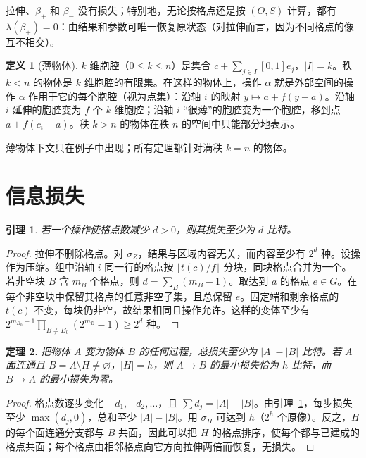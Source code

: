 \documentclass[11pt,a4paper]{article}
\theoremstyle{plain}
\newtheorem{theorem}{定理}
\newtheorem{lemma}[theorem]{引理}
\theoremstyle{definition}
\newtheorem{definition}{定义}
\theoremstyle{remark}
\begin{document}
拉伸、$\beta_+$ 和 $\beta_-$ 没有损失；特别地，无论按格点还是按 $(O,S)$ 计算，都有 $\lambda(\beta_\pm)=0$：由结果和参数可唯一恢复原状态（对拉伸而言，因为不同格点的像互不相交）。

\begin{definition}[薄物体]
$k$ 维胞腔（$0\le k\le n$）是集合 $c+\sum_{j\in I}[0,1]e_j$，$|I|=k$。秩 $k<n$ 的物体是 $k$ 维胞腔的有限集。在这样的物体上，操作 $\alpha$ 就是外部空间的操作 $\alpha$ 作用于它的每个胞腔（视为点集）：沿轴 $i$ 的映射 $y\mapsto a+f(y-a)$。沿轴 $i$ 延伸的胞腔变为 $f$ 个 $k$ 维胞腔；沿轴 $i$ “很薄”的胞腔变为一个胞腔，移到点 $a+f(c_i-a)$。秩 $k>n$ 的物体在秩 $n$ 的空间中只能部分地表示。
\end{definition}

薄物体下文只在例子中出现；所有定理都针对满秩 $k=n$ 的物体。

\section{信息损失}\label{sec:loss}

\begin{lemma}\label{lem:bit}
若一个操作使格点数减少 $d>0$，则其损失至少为 $d$ 比特。
\end{lemma}
\begin{proof}
拉伸不删除格点。对 $\sigma_Z$，结果与区域内容无关，而内容至少有 $2^d$ 种。设操作为压缩。组中沿轴 $i$ 同一行的格点按 $\lfloor t(c)/f\rfloor$ 分块，同块格点合并为一个。若非空块 $B$ 含 $m_B$ 个格点，则 $d=\sum_B(m_B-1)$。取达到 $a$ 的格点 $e\in G$。在每个非空块中保留其格点的任意非空子集，且总保留 $e$。固定端和剩余格点的 $t(c)$ 不变，每块仍非空，故结果相同且操作允许。这样的变体至少有 $2^{m_{B_0}-1}\prod_{B\ne B_0}(2^{m_B}-1)\ge 2^{d}$ 种。
\end{proof}

\begin{theorem}\label{thm:loss}
把物体 $A$ 变为物体 $B$ 的任何过程，总损失至少为 $|A|-|B|$ 比特。若 $A$ 面连通且 $B=A\setminus H\neq\varnothing$，$|H|=h$，则 $A\to B$ 的最小损失恰为 $h$ 比特，而 $B\to A$ 的最小损失为零。
\end{theorem}
\begin{proof}
格点数逐步变化 $-d_1,-d_2,\dots$，且 $\sum d_j=|A|-|B|$。由引理~\ref{lem:bit}，每步损失至少 $\max(d_j,0)$，总和至少 $|A|-|B|$。用 $\sigma_H$ 可达到 $h$（$2^h$ 个原像）。反之，$H$ 的每个面连通分支都与 $B$ 共面，因此可以把 $H$ 的格点排序，使每个都与已建成的格点共面；每个格点由相邻格点向它方向拉伸两倍而恢复，无损失。
\end{proof}
\end{document}

